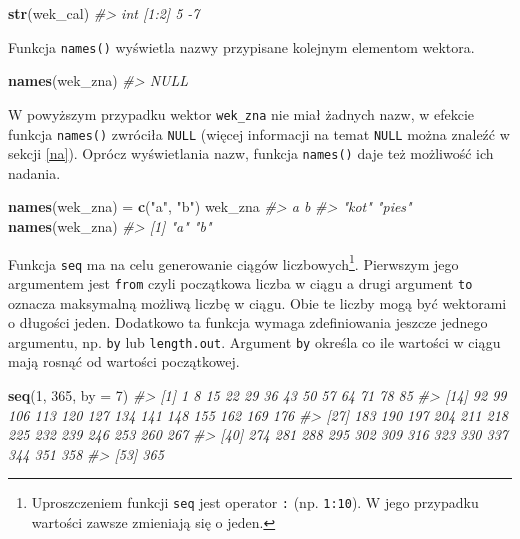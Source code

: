\documentclass[paper=6in:9in,pagesize=pdftex,headinclude=on,footinclude=on,10pt]{scrbook}
\newenvironment{Shaded}{\begin{snugshade}}{\end{snugshade}}
\newcommand{\CommentTok}[1]{\textcolor[rgb]{0.56,0.35,0.01}{\textit{#1}}}
\newcommand{\DataTypeTok}[1]{\textcolor[rgb]{0.13,0.29,0.53}{#1}}
\newcommand{\DecValTok}[1]{\textcolor[rgb]{0.00,0.00,0.81}{#1}}
\newcommand{\KeywordTok}[1]{\textcolor[rgb]{0.13,0.29,0.53}{\textbf{#1}}}
\newcommand{\NormalTok}[1]{#1}
\newcommand{\StringTok}[1]{\textcolor[rgb]{0.31,0.60,0.02}{#1}}
\begin{document}
\begin{Shaded}
\begin{Highlighting}[]
\KeywordTok{str}\NormalTok{(wek_cal)}
\CommentTok{#>  int [1:2] 5 -7}
\end{Highlighting}
\end{Shaded}

Funkcja \texttt{names()} wyświetla nazwy przypisane kolejnym elementom wektora.

\begin{Shaded}
\begin{Highlighting}[]
\KeywordTok{names}\NormalTok{(wek_zna)}
\CommentTok{#> NULL}
\end{Highlighting}
\end{Shaded}

W powyższym przypadku wektor \texttt{wek\_zna} nie miał żadnych nazw, w efekcie funkcja \texttt{names()} zwróciła \texttt{NULL} (więcej informacji na temat \texttt{NULL} można znaleźć w sekcji \ref{na}).
Oprócz wyświetlania nazw, funkcja \texttt{names()} daje też możliwość ich nadania.

\begin{Shaded}
\begin{Highlighting}[]
\KeywordTok{names}\NormalTok{(wek_zna) =}\StringTok{ }\KeywordTok{c}\NormalTok{(}\StringTok{"a"}\NormalTok{, }\StringTok{"b"}\NormalTok{)}
\NormalTok{wek_zna}
\CommentTok{#>      a      b }
\CommentTok{#>  "kot" "pies"}
\KeywordTok{names}\NormalTok{(wek_zna)}
\CommentTok{#> [1] "a" "b"}
\end{Highlighting}
\end{Shaded}

Funkcja \texttt{seq} ma na celu generowanie ciągów liczbowych\footnote{Uproszczeniem funkcji \texttt{seq} jest operator \texttt{:} (np. \texttt{1:10}). W jego przypadku wartości zawsze zmieniają się o jeden.}.
Pierwszym jego argumentem jest \texttt{from} czyli początkowa liczba w ciągu a drugi argument \texttt{to} oznacza maksymalną możliwą liczbę w ciągu.
Obie te liczby mogą być wektorami o długości jeden.
Dodatkowo ta funkcja wymaga zdefiniowania jeszcze jednego argumentu, np. \texttt{by} lub \texttt{length.out}.
Argument \texttt{by} określa co ile wartości w ciągu mają rosnąć od wartości początkowej.

\begin{Shaded}
\begin{Highlighting}[]
\KeywordTok{seq}\NormalTok{(}\DecValTok{1}\NormalTok{, }\DecValTok{365}\NormalTok{, }\DataTypeTok{by =} \DecValTok{7}\NormalTok{)}
\CommentTok{#>  [1]   1   8  15  22  29  36  43  50  57  64  71  78  85}
\CommentTok{#> [14]  92  99 106 113 120 127 134 141 148 155 162 169 176}
\CommentTok{#> [27] 183 190 197 204 211 218 225 232 239 246 253 260 267}
\CommentTok{#> [40] 274 281 288 295 302 309 316 323 330 337 344 351 358}
\CommentTok{#> [53] 365}
\end{Highlighting}
\end{Shaded}
\end{document}
